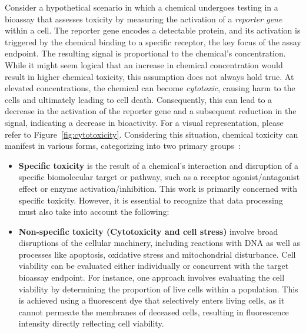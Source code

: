 Consider a hypothetical scenario in which a chemical undergoes testing in a bioassay that assesses toxicity by measuring the activation of a \emph{reporter gene} within a cell. The reporter gene encodes a detectable protein, and its activation is triggered by the chemical binding to a specific receptor, the key focus of the assay endpoint. The resulting signal is proportional to the chemical's concentration. While it might seem logical that an increase in chemical concentration would result in higher chemical toxicity, this assumption does not always hold true. At elevated concentrations, the chemical can become \emph{cytotoxic}, causing harm to the cells and ultimately leading to cell death. Consequently, this can lead to a decrease in the activation of the reporter gene and a subsequent reduction in the signal, indicating a decrease in bioactivity. For a visual representation, please refer to Figure~\ref{fig:cytotoxicity}. Considering this situation, chemical toxicity can manifest in various forms, categorizing into two primary groups~\cite{judson2016}: 
\begin{itemize}
    \item \textbf{Specific toxicity} is the result of a chemical's interaction and disruption of a specific biomolecular target or pathway, such as a receptor agonist/antagonist effect or enzyme activation/inhibition. This work is primarily concerned with specific toxicity. However, it is essential to recognize that data processing must also take into account the following:
    \item \textbf{Non-specific toxicity (Cytotoxicity and cell stress)} involve broad disruptions of the cellular machinery, including reactions with DNA as well as processes like apoptosis, oxidative stress and mitochondrial disturbance. Cell viability can be evaluated either individually or concurrent with the target bioassay endpoint. For instance, one approach involves evaluating the cell viability by determining the proportion of live cells within a population. This is achieved using a fluorescent dye that selectively enters living cells, as it cannot permeate the membranes of deceased cells, resulting in fluorescence intensity directly reflecting cell viability.
\end{itemize}

